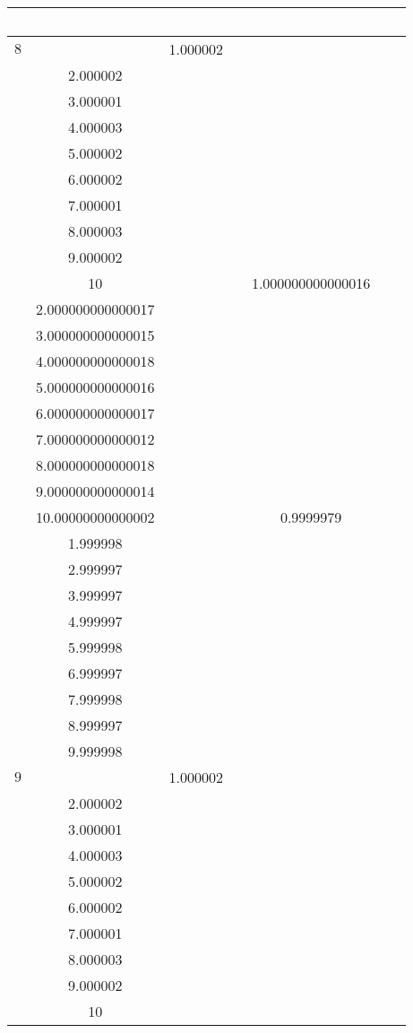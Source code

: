 \documentclass[oneside, final, 12pt]{extarticle}
\begin{document}
\begin{longtable}{|c|c|c|c|c|c|c|}
& ~ 
\\ \hline
\(8\) & \( \begin{aligned}
& 1.000002 \\ & 2.000002 \\ & 3.000001 \\ & 4.000003 \\ & 5.000002 \\ & 6.000002 \\ & 7.000001 \\ & 8.000003 \\ & 9.000002 \\ & 10 
\end{aligned} \)
& ~ 
& \( \begin{aligned}
& 1.000000000000016 \\ & 2.000000000000017 \\ & 3.000000000000015 \\ & 4.000000000000018 \\ & 5.000000000000016 \\ & 6.000000000000017 \\ & 7.000000000000012 \\ & 8.000000000000018 \\ & 9.000000000000014 \\ & 10.00000000000002 
\end{aligned} \)
& ~ 
& \( \begin{aligned}
& 0.9999979 \\ & 1.999998 \\ & 2.999997 \\ & 3.999997 \\ & 4.999997 \\ & 5.999998 \\ & 6.999997 \\ & 7.999998 \\ & 8.999997 \\ & 9.999998 
\end{aligned} \)
& ~ 
\\ \hline
\(9\) & \( \begin{aligned}
& 1.000002 \\ & 2.000002 \\ & 3.000001 \\ & 4.000003 \\ & 5.000002 \\ & 6.000002 \\ & 7.000001 \\ & 8.000003 \\ & 9.000002 \\ & 10 

\end{aligned}
\end{longtable}
\end{document}
